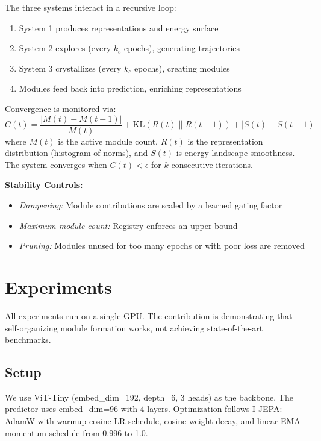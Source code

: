 \documentclass[10pt,twocolumn]{article}
\begin{document}
The three systems interact in a recursive loop:
\begin{enumerate}
    \item System 1 produces representations and energy surface
    \item System 2 explores (every $k_e$ epochs), generating trajectories
    \item System 3 crystallizes (every $k_c$ epochs), creating modules
    \item Modules feed back into prediction, enriching representations
\end{enumerate}

Convergence is monitored via:
\begin{equation}
    C(t) = \frac{|M(t) - M(t\!-\!1)|}{M(t)} + \text{KL}(R(t) \| R(t\!-\!1)) + |S(t) - S(t\!-\!1)|
\end{equation}
where $M(t)$ is the active module count, $R(t)$ is the representation distribution (histogram of norms), and $S(t)$ is energy landscape smoothness. The system converges when $C(t) < \epsilon$ for $k$ consecutive iterations.

\textbf{Stability Controls:}
\begin{itemize}
    \item \emph{Dampening:} Module contributions are scaled by a learned gating factor
    \item \emph{Maximum module count:} Registry enforces an upper bound
    \item \emph{Pruning:} Modules unused for too many epochs or with poor loss are removed
\end{itemize}

\section{Experiments}

All experiments run on a single GPU. The contribution is demonstrating that self-organizing module formation works, not achieving state-of-the-art benchmarks.

\subsection{Setup}

We use ViT-Tiny (embed\_dim=192, depth=6, 3 heads) as the backbone. The predictor uses embed\_dim=96 with 4 layers. Optimization follows I-JEPA: AdamW with warmup cosine LR schedule, cosine weight decay, and linear EMA momentum schedule from 0.996 to 1.0.
\end{document}
